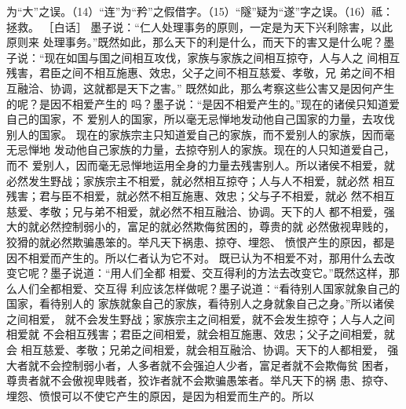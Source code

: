 \documentclass[12pt,UTF8]{ctexbook}
\begin{document}
为“大”之误。（14）“连”为“矜”之假借字。（15）“隧”疑为“遂”字之误。（16）祗：拯救。 
［白话］ 
墨子说：“仁人处理事务的原则，一定是为天下兴利除害，以此原则来 
处理事务。”既然如此，那么天下的利是什么，而天下的害又是什么呢？墨 
子说：“现在如国与国之间相互攻伐，家族与家族之间相互掠夺，人与人之 
间相互残害，君臣之间不相互施惠、效忠，父子之间不相互慈爱、孝敬，兄 
弟之间不相互融洽、协调，这就都是天下之害。” 
既然如此，那么考察这些公害又是因何产生的呢？是因不相爱产生的 
吗？墨子说：“是因不相爱产生的。”现在的诸侯只知道爱自己的国家，不 
爱别人的国家，所以毫无忌惮地发动他自己国家的力量，去攻伐别人的国家。 
现在的家族宗主只知道爱自己的家族，而不爱别人的家族，因而毫无忌惮地 
发动他自己家族的力量，去掠夺别人的家族。现在的人只知道爱自己，而不 
爱别人，因而毫无忌惮地运用全身的力量去残害别人。所以诸侯不相爱，就 
必然发生野战；家族宗主不相爱，就必然相互掠夺；人与人不相爱，就必然 
相互残害；君与臣不相爱，就必然不相互施惠、效忠；父与子不相爱，就必 
然不相互慈爱、孝敬；兄与弟不相爱，就必然不相互融洽、协调。天下的人 
都不相爱，强大的就必然控制弱小的，富足的就必然欺侮贫困的，尊贵的就 
必然傲视卑贱的，狡猾的就必然欺骗愚笨的。举凡天下祸患、掠夺、埋怨、 
愤恨产生的原因，都是因不相爱而产生的。所以仁者认为它不对。 
既已认为不相爱不对，那用什么去改变它呢？墨子说道：“用人们全都 
相爱、交互得利的方法去改变它。”既然这样，那么人们全都相爱、交互得 
利应该怎样做呢？墨子说道：“看待别人国家就象自己的国家，看待别人的 
家族就象自己的家族，看待别人之身就象自己之身。”所以诸侯之间相爱， 
就不会发生野战；家族宗主之间相爱，就不会发生掠夺；人与人之间相爱就 
不会相互残害；君臣之间相爱，就会相互施惠、效忠；父子之间相爱，就会 
相互慈爱、孝敬；兄弟之间相爱，就会相互融洽、协调。天下的人都相爱， 
强大者就不会控制弱小者，人多者就不会强迫人少者，富足者就不会欺侮贫 
困者，尊贵者就不会傲视卑贱者，狡诈者就不会欺骗愚笨者。举凡天下的祸 
患、掠夺、埋怨、愤恨可以不使它产生的原因，是因为相爱而生产的。所以 
\end{document}
